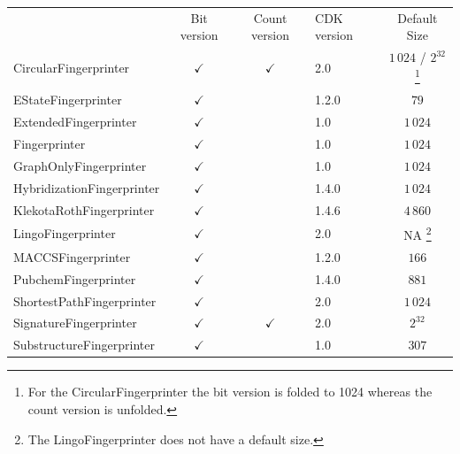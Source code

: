 \documentclass[10pt]{bmcart}
\def \cdkversion {2.0}
\begin{document}
\begin{backmatter}
    \begin{minipage}{1\textwidth}
    \renewcommand*{\thempfootnote}{\fnsymbol{mpfootnote}}
    \centering
    \begin{tabular}{lcclc}
                             & Bit version  & Count version & CDK version & Default Size    \\
  CircularFingerprinter~\cite{rogers2010extended, Clark2014}      & $\checkmark$ & $\checkmark$  & \cdkversion{}     & $1\,024$ / $2^{32}$%
\footnote[1]{For the CircularFingerprinter the bit version is folded to 1024 whereas the count version is unfolded.} \\
  EStateFingerprinter~\cite{Hall1995}       & $\checkmark$ &               & 1.2.0       & $79$            \\
  ExtendedFingerprinter      & $\checkmark$ &               & 1.0         & $1\,024$        \\
  Fingerprinter              & $\checkmark$ &               & 1.0         & $1\,024$        \\
  GraphOnlyFingerprinter     & $\checkmark$ &               & 1.0         & $1\,024$        \\
  HybridizationFingerprinter & $\checkmark$ &               & 1.4.0       & $1\,024$        \\
  KlekotaRothFingerprinter~\cite{Klekota2008}   & $\checkmark$ &               & 1.4.6       & $4\,860$        \\
  LingoFingerprinter~\cite{vidal2005lingo}         & $\checkmark$ &               & \cdkversion{}     & NA%
\footnote[2]{The LingoFingerprinter does not have a default size.}
                                                                                             \\
  MACCSFingerprinter         & $\checkmark$ &               & 1.2.0       & $166$           \\
  PubchemFingerprinter~\cite{pubchemFP}       & $\checkmark$ &               & 1.4.0       & $881$            \\
  ShortestPathFingerprinter  & $\checkmark$ &               & \cdkversion{}     & $1\,024$        \\
  SignatureFingerprinter~\cite{signaturefingerprints}     & $\checkmark$ & $\checkmark$  & \cdkversion{}     & $2^{32}$         \\
  SubstructureFingerprinter  & $\checkmark$ &               & 1.0         & $307$           \\

    \end{tabular}
    \end{minipage}


\end{backmatter}
\end{document}

